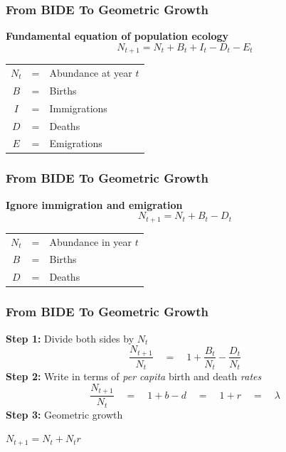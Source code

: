 \documentclass[color=usenames,dvipsnames]{beamer}\usepackage[]{graphicx}\usepackage[]{color}
\begin{document}
\begin{frame}
  \frametitle{From {\color{red} BIDE} To Geometric Growth}
  {\bf \large Fundamental equation of population ecology}
  \[
  N_{t+1} = N_t + B_t + I_t - D_t - E_t
  \]
  \vspace{0.5cm}
  \begin{tabular}{ccl}
    $N_t$ & = & Abundance at year $t$ \\
    {\color{red} $B$}    & = & Births       \\
    {\color{red} $I$}    & = & Immigrations \\
    {\color{red} $D$}    & = & Deaths       \\
    {\color{red} $E$}    & = & Emigrations \\
  \end{tabular}
\end{frame}


\begin{frame}
  \frametitle{From {\color{red} BIDE} To Geometric Growth}
  {\bf \large Ignore immigration and emigration}
  \[
  N_{t+1} = N_t + B_t - D_t
  \]
  \vspace{0.5cm}
  \begin{tabular}{ccl}
    $N_t$ & = & Abundance in year $t$ \\
    {\color{red} $B$}    & = & Births       \\
    {\color{red} $D$}    & = & Deaths       \\
  \end{tabular}
\end{frame}


\begin{frame}
  \frametitle{From {\color{red} BIDE} To Geometric Growth}
    \textbf{Step 1:} Divide both sides by $N_{t}$
      \[
        \frac{N_{t+1}}{N_{t}} \quad = \quad 1 + \frac{B_t}{N_{t}} - \frac{D_t}{N_{t}}
      \]
   \pause
    \textbf{Step 2:} Write in terms of \textit{per capita} birth and death \textit{rates}
      \[
        \frac{N_{t+1}}{N_{t}} \quad  = \quad 1 + b - d \quad = \quad 1 + r \quad = \quad \lambda
      \]
    \pause
    \textbf{Step 3:} Geometric growth \par
    \begin{center}
      $N_{t+1} = N_t + N_tr$
    \end{center}
\end{frame}
\end{document}
